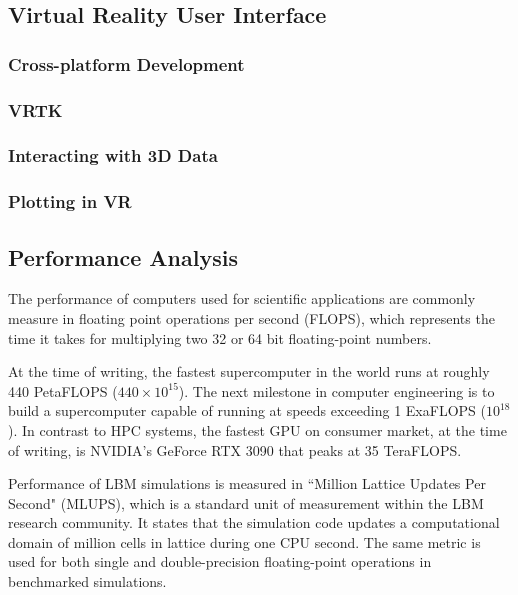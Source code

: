 
\subsection{Virtual Reality User Interface}

\subsubsection{Cross-platform Development}

\subsubsection{VRTK} %

\subsubsection{Interacting with 3D Data}

\subsubsection{Plotting in VR}


\subsection{Performance Analysis}
The performance of computers used for scientific applications are commonly measure in floating point operations per second (FLOPS), which represents the time it takes for multiplying two 32 or 64 bit floating-point numbers.

At the time of writing, the fastest supercomputer in the world runs at roughly 440 PetaFLOPS ($440\times10^{15}$). The next milestone in computer engineering is to build a supercomputer capable of running at speeds exceeding 1 ExaFLOPS ($10^{18}$). In contrast to HPC systems, the fastest GPU on consumer market, at the time of writing, is NVIDIA's GeForce RTX 3090 that peaks at 35 TeraFLOPS.

Performance of LBM simulations is measured in ``Million Lattice Updates Per Second" (MLUPS), which is a standard unit of measurement within the LBM research community. It states that the simulation code updates a computational domain of million cells in lattice during one CPU second. The same metric is used for both single and double-precision floating-point operations in benchmarked simulations. 

